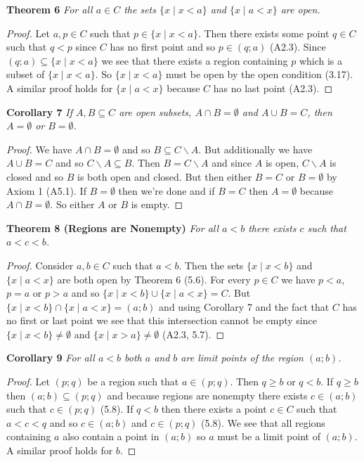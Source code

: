 \documentclass{article}
\begin{document}
\begin{flushleft}
\textbf{Theorem 6}
\textsl{For all $a \in C$ the sets $\{x \mid x < a\}$ and $\{x \mid a < x\}$ are open.}
\begin{proof}
Let $a,p \in C$ such that $p \in \{x \mid x < a\}$. Then there exists some point $q \in C$ such that $q<p$ since $C$ has no first point and so $p \in (q;a)$ (A2.3). Since $(q;a) \subseteq \{x \mid x<a\}$ we see that there exists a region containing $p$ which is a subset of $\{x \mid x<a\}$. So $\{x \mid x<a\}$ must be open by the open condition (3.17). A similar proof holds for $\{x \mid a < x\}$ because $C$ has no last point (A2.3).
\end{proof}

\textbf{Corollary 7}
\textsl{If $A,B \subseteq C$ are open subsets, $A \cap B = \emptyset$ and $A \cup B = C$, then $A=\emptyset$ or $B=\emptyset$.}
\begin{proof}
We have $A \cap B = \emptyset$ and so $B \subseteq C \backslash A$. But additionally we have $A \cup B = C$ and so $C \backslash A \subseteq  B$. Then $B = C \backslash A$ and since $A$ is open, $C \backslash A$ is closed and so $B$ is both open and closed. But then either $B = C$ or $B = \emptyset$ by Axiom 1 (A5.1). If $B = \emptyset$ then we're done and if $B=C$ then $A = \emptyset$ because $A \cap B = \emptyset$. So either $A$ or $B$ is empty.
\end{proof}

\textbf{Theorem 8 (Regions are Nonempty)}
\textsl{For all $a<b$ there exists $c$ such that $a<c<b$.}
\begin{proof}
Consider $a,b \in C$ such that $a<b$. Then the sets $\{x \mid x < b\}$ and $\{x \mid a < x\}$ are both open by Theorem 6 (5.6). For every $p \in C$ we have $p<a$, $p=a$ or $p>a$ and so $\{x \mid x < b\} \cup \{x \mid a < x\} = C$. But $\{x \mid x<b\} \cap \{x \mid a<x\}=(a;b)$ and using Corollary 7 and the fact that $C$ has no first or last point we see that this intersection cannot be empty since $\{x \mid x<b\} \neq \emptyset$ and $\{x \mid x>a\} \neq \emptyset$ (A2.3, 5.7).
\end{proof}

\textbf{Corollary 9}
\textsl{For all $a<b$ both $a$ and $b$ are limit points of the region $(a;b)$.}
\begin{proof}
Let $(p;q)$ be a region such that $a \in (p;q)$. Then $q \geq b$ or $q<b$. If $q \geq b$ then $(a;b) \subseteq (p;q)$ and because regions are nonempty there exists $c \in (a;b)$ such that $c \in (p;q)$ (5.8). If $q<b$ then there exists a point $c \in C$ such that $a < c < q$ and so $c \in (a;b)$ and $c \in (p;q)$ (5.8). We see that all regions containing $a$ also contain a point in $(a;b)$ so $a$ must be a limit point of $(a;b)$. A similar proof holds for $b$.
\end{proof}


\end{flushleft}
\end{document}

